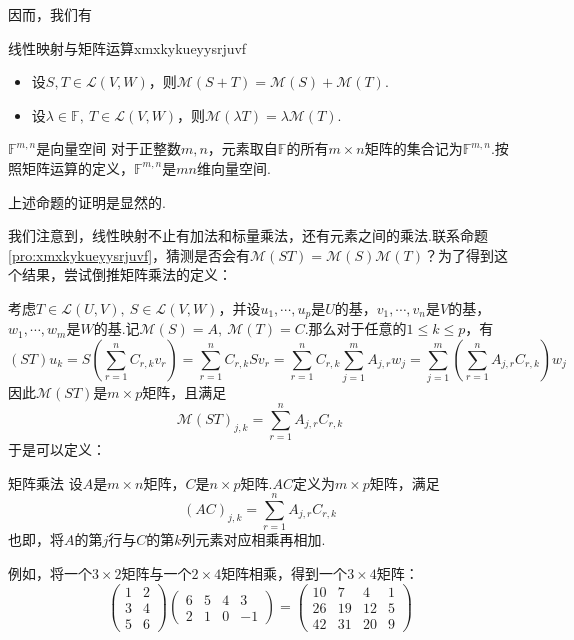 \documentclass[lang=cn, zihao=5]{elegantbook}
\newcommand{\ssb}[1]{\left( #1 \right)}
\newcommand{\F}{\mathbb{F}}
\newcommand{\lmap}{\mathcal{L}}
\newcommand{\mmatrix}{\mathcal{M}}
\begin{document}
因而，我们有

\begin{proposition}{线性映射与矩阵运算}{xmxkykueyysrjuvf}
	\begin{itemize}
		\item 设$S,T \in \lmap (V,W)$，则$\mmatrix (S+T)=\mmatrix (S) + \mmatrix (T)$. 
		\item 设$\lambda \in \F ,~T \in \lmap (V,W)$，则$\mmatrix (\lambda T) = \lambda \mmatrix (T)$.
	\end{itemize}
\end{proposition}

\begin{proposition}{$\F ^{m,n}$是向量空间}
	对于正整数$m,n$，元素取自$\F$的所有$m \times n$矩阵的集合记为$\F ^{m,n}$.按照矩阵运算的定义，$\F ^{m,n}$是$mn$维向量空间.
\end{proposition}

上述命题的证明是显然的.

我们注意到，线性映射不止有加法和标量乘法，还有元素之间的乘法.联系命题\ref{pro:xmxkykueyysrjuvf}，猜测是否会有$\mmatrix (ST)= \mmatrix (S) \mmatrix (T)$？为了得到这个结果，尝试倒推矩阵乘法的定义：

考虑$T \in \lmap (U,V),~S \in \lmap (V,W)$，并设$u_1, \cdots ,u_p$是$U$的基，$v_1, \cdots ,v_n$是$V$的基，$w_1, \cdots ,w_m$是$W$的基.记$\mmatrix (S)=A,~\mmatrix (T)=C$.那么对于任意的$1 \leq k \leq p$，有$$(ST)u_k = S\ssb{\sum_{r=1}^{n} C_{r,k}v_r} = \sum_{r=1}^{n} C_{r,k}Sv_r = \sum_{r=1}^{n} C_{r,k} \sum_{j=1}^{m} A_{j,r}w_j = \sum_{j=1}^{m} \ssb{\sum_{r=1}^{n} A_{j,r} C_{r,k}} w_j$$
因此$\mmatrix (ST)$是$m \times p$矩阵，且满足$$\mmatrix (ST)_{j,k} = \sum_{r=1}^{n} A_{j,r} C_{r,k}$$
于是可以定义：

\begin{definition}{矩阵乘法}
	设$A$是$m \times n$矩阵，$C$是$n \times p$矩阵.$AC$定义为$m \times p$矩阵，满足$$(AC)_{j,k} = \sum_{r=1}^{n} A_{j,r} C_{r,k}$$
	也即，将$A$的第$j$行与$C$的第$k$列元素对应相乘再相加.
\end{definition}

例如，将一个$3 \times 2$矩阵与一个$2 \times 4$矩阵相乘，得到一个$3 \times 4$矩阵：$$\begin{pmatrix}
	1 & 2 \\ 3 & 4 \\ 5 & 6
\end{pmatrix} \begin{pmatrix}
	6 & 5 & 4 & 3 \\ 2 & 1 & 0 & -1
\end{pmatrix} = \begin{pmatrix}
	10 & 7 & 4 & 1 \\ 26 & 19 & 12 & 5 \\ 42 & 31 & 20 & 9
\end{pmatrix}$$
\end{document}
